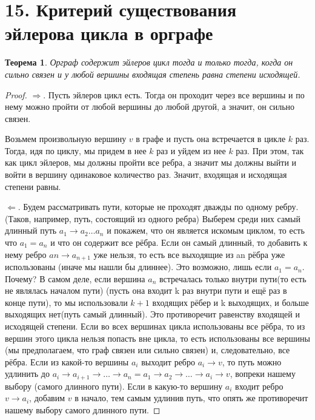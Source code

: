 \documentclass[a4paper,12pt]{article}
\newtheorem*{ther}{Теорема}
\begin{document}
	\section*{15. Критерий существования эйлерова цикла в орграфе}
	\begin{ther}
		Орграф содержит эйлеров цикл тогда и только тогда, когда он сильно связен и у любой вершины входящая степень равна степени исходящей.
	\end{ther}

	\begin{proof}

		$\Rightarrow$. Пусть эйлеров цикл есть. Тогда он проходит через все вершины и по нему можно пройти от любой вершины до любой другой, а значит, он сильно связен.

		Возьмем произвольную вершину $v$ в графе и пусть она встречается в цикле $k$ раз. Тогда, идя по циклу, мы придем в нее $k$ раз и уйдем из нее $k$ раз. При этом, так как цикл эйлеров, мы должны пройти все ребра, а значит мы должны выйти и войти в вершину одинаковое количество раз. Значит, входящая и исходящая степени равны.


		$\Leftarrow$. Будем рассматривать пути, которые не проходят дважды по одному ребру. (Таков,
		например, путь, состоящий из одного ребра) Выберем среди них самый длинный путь
		$a_1 \rightarrow a_2 \ldots a_n$ и покажем, что он является искомым циклом, то есть что
		$a_1 = a_n$ и что он содержит все рёбра.
		Если он самый длинный, то добавить к нему ребро $an \rightarrow a_{n+1}$ уже нельзя, то есть все
		выходящие из an рёбра уже использованы (иначе мы нашли бы длиннее). Это возможно,
		лишь если $a_1 = a_n$. Почему? В самом деле, если вершина $a_n$ встречалась только внутри
		пути(то есть не являлась началом пути) (пусть она входит k раз внутри пути и ещё раз в
		конце пути), то мы использовали $k + 1$ входящих рёбер и k выходящих, и больше
		выходящих нет(путь самый длинный).
		Это противоречит равенству входящей и исходящей степени.
		Если во всех вершинах цикла использованы все рёбра,
		то из вершин этого цикла нельзя попасть вне цикла, то есть использованы все вершины
		(мы предполагаем, что граф связен или сильно связен) и, следовательно, все рёбра.
		Если из какой-то вершины $a_i$ выходит ребро $a_i \rightarrow v$, то путь можно удлинить до
		$a_i \rightarrow a_{i+1} \rightarrow \ldots \rightarrow a_n = a_1 \rightarrow a_2 \rightarrow \ldots \rightarrow a_i \rightarrow v$, вопреки нашему выбору (самого
		длинного пути). Если в какую-то вершину $a_i$ входит ребро $v \rightarrow a_i$, добавим $v$ в начало,
		тем самым удлинив путь, что опять же противоречит нашему выбору самого длинного
		пути.
	\end{proof}
\end{document}
